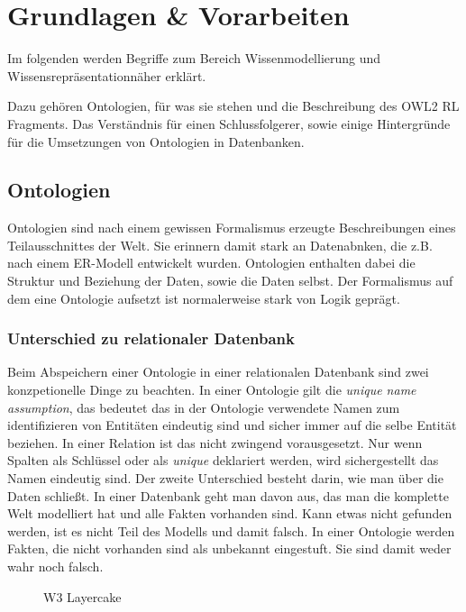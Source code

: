 \chapter{Grundlagen \& Vorarbeiten}
\label{kapitel-grundlagen}
Im folgenden werden Begriffe zum Bereich Wissenmodellierung und Wissensrepräsentationnäher erklärt.

Dazu gehören Ontologien, für was sie stehen und die Beschreibung des OWL2 RL Fragments. Das Verständnis für einen Schlussfolgerer, sowie einige Hintergründe für die Umsetzungen von Ontologien in Datenbanken.

\section{Ontologien}

Ontologien sind nach einem gewissen Formalismus erzeugte Beschreibungen eines Teilausschnittes der Welt. Sie erinnern damit stark an Datenabnken, die  z.B. nach einem ER-Modell entwickelt wurden. Ontologien enthalten dabei die Struktur und Beziehung der Daten, sowie die Daten selbst. Der Formalismus auf dem eine Ontologie aufsetzt ist normalerweise stark von Logik geprägt.

\subsection{Unterschied zu relationaler Datenbank}

Beim Abspeichern einer Ontologie in einer relationalen Datenbank sind zwei konzpetionelle Dinge zu beachten. In einer Ontologie gilt die \emph{unique name assumption}, das bedeutet das in der Ontologie verwendete Namen zum identifizieren von Entitäten eindeutig sind und sicher immer auf die selbe Entität beziehen. In einer Relation ist das nicht zwingend vorausgesetzt. Nur wenn Spalten als Schlüssel oder als \emph{unique} deklariert werden, wird sichergestellt das Namen eindeutig sind.
Der zweite Unterschied besteht darin, wie man über die Daten schließt. In einer Datenbank geht man davon aus, das man die komplette Welt modelliert hat und alle Fakten vorhanden sind. Kann etwas nicht gefunden werden, ist es nicht Teil des Modells und damit falsch. In einer Ontologie werden Fakten, die nicht vorhanden sind als unbekannt eingestuft. Sie sind damit weder wahr noch falsch.
\begin{figure}
	\caption{W3 Layercake}
	\label{image-w3-layercake}
\end{figure}

